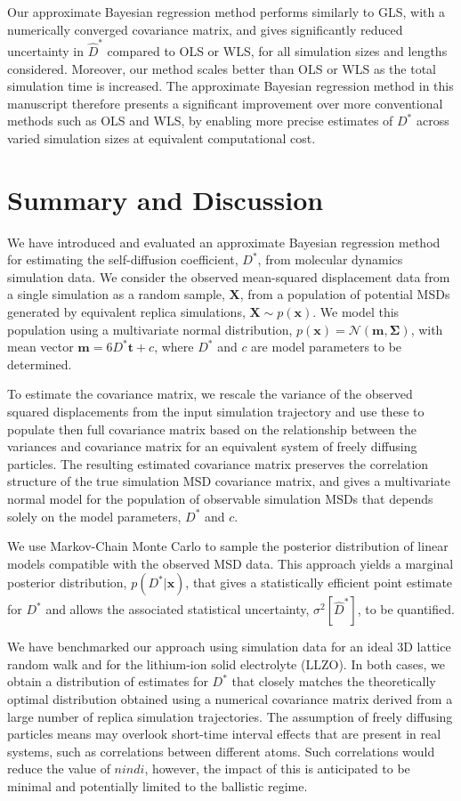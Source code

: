 \documentclass[reprint,superscriptaddress,nobibnotes,amsmath,amssymb,aps,prx,hidelinks,linenumbers]{revtex4-2}
\newcommand{\oMSD}{\ensuremath{\bm{x}}}
\newcommand{\model}{\bm{m}}
\newcommand{\prob}[1]{\ensuremath{p(#1)}}
\newcommand{\Dest}{\ensuremath{\widehat{D}^*}}
\newcommand{\D}{\ensuremath{D^*}}
\newcommand{\var}[1]{\ensuremath{\sigma^2[#1]}}
\begin{document}
Our approximate Bayesian regression method performs similarly to GLS, with a numerically converged covariance matrix, and gives significantly reduced uncertainty in $\Dest$ compared to OLS or WLS, for all simulation sizes and lengths considered.
Moreover, our method scales better than OLS or WLS as the total simulation time is increased.
The approximate Bayesian regression method in this manuscript therefore presents a significant improvement over more conventional methods such as OLS and WLS, by enabling more precise estimates of $\D$ across varied simulation sizes at equivalent computational cost.

\section{Summary and Discussion}

We have introduced and evaluated an approximate Bayesian regression method for estimating the self-diffusion coefficient, $\D$, from molecular dynamics simulation data.
We consider the observed mean-squared displacement data from a single simulation as a random sample, $\bm{X}$, from a population of potential MSDs generated by equivalent replica simulations, $\bm{X}\sim p(\oMSD)$.
We model this population using a multivariate normal distribution, $p(\oMSD) = \mathcal{N}(\model, \mathbf{\Sigma})$, with mean vector $\model = 6\D\bm{t} + c$, where $\D$ and $c$ are model parameters to be determined.

To estimate the covariance matrix, we rescale the variance of the observed squared displacements from the input simulation trajectory and use these to populate then full covariance matrix based on the relationship between the variances and covariance matrix for an equivalent system of freely diffusing particles.
The resulting estimated covariance matrix preserves the correlation structure of the true simulation MSD covariance matrix, and gives a multivariate normal model for the population of observable simulation MSDs that depends solely on the model parameters, $\D$ and $c$.

We use Markov-Chain Monte Carlo to sample the posterior distribution of linear models compatible with the observed MSD data.
This approach yields a marginal posterior distribution, $\prob{\D | \oMSD}$, that gives a statistically efficient point estimate for $\D$ and allows the associated statistical uncertainty, $\var{\Dest}$, to be quantified.

We have benchmarked our approach using simulation data for an ideal 3D lattice random walk and for the lithium-ion solid electrolyte  (LLZO).
In both cases, we obtain a distribution of estimates for $\D$ that closely matches the theoretically optimal distribution obtained using a numerical covariance matrix derived from a large number of replica simulation trajectories.
The assumption of freely diffusing particles means may overlook short-time interval effects that are present in real systems, such as correlations between different atoms.
Such correlations would reduce the value of $nind{i}$, however, the impact of this is anticipated to be minimal and potentially limited to the ballistic regime.
\end{document}
